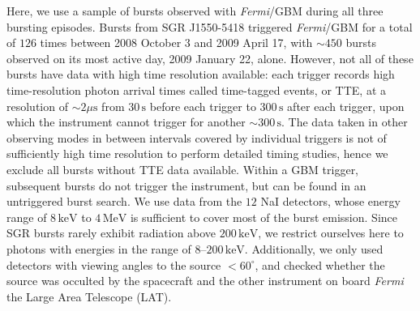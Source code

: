 \documentclass[12pt]{emulateapj}
\newcommand{\project}[1]{\textsl{#1}}
\newcommand{\fermi}{\project{Fermi}}
\begin{document}
Here, we use a sample of bursts observed with \fermi/GBM \citep{meegan2009} during all three bursting episodes. Bursts from SGR J1550-5418 triggered \fermi/GBM for a total of $126$ 
times between 2008 October 3 and 2009 April 17, with $\sim\!\! 450$ bursts observed on its most active day, 2009 January 22, alone. However, not all of these bursts have data with high time resolution
available: each trigger records high time-resolution photon arrival times called time-tagged events, or TTE, at a resolution of $\sim\!\! 2\mu\mathrm{s}$ from $30\,\mathrm{s}$ 
before each trigger to $300\,\mathrm{s}$ after each trigger, upon which the instrument cannot trigger for another $\sim\!\! 300 \,\mathrm{s}$. The data taken in other observing modes in between intervals covered
by individual triggers is not of sufficiently high time resolution to perform detailed timing studies, hence we exclude all bursts without TTE data available.
Within a GBM trigger, subsequent bursts do not trigger the instrument, but can be found in an untriggered burst search.
We use data from the $12$ NaI detectors, whose energy range of $8\,\mathrm{keV}$ to $4\,\mathrm{MeV}$ is sufficient to cover most of the burst emission. Since SGR bursts rarely exhibit radiation above $200\,\mathrm{keV}$, we restrict ourselves 
here to photons with energies in the range of $8$--$200\,\mathrm{keV}$.
Additionally, we only used detectors with viewing angles to the source $< 60^{\circ}$, and checked whether the source was occulted by the spacecraft and the other instrument on board \fermi\, the Large Area Telescope (LAT)\@. 
\end{document}
